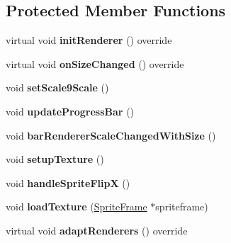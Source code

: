 \subsection*{Protected Member Functions}
\begin{DoxyCompactItemize}
\item 
\mbox{\label{classui_1_1LoadingBar_aac2250cab0b284639e37b63985267aca}} 
virtual void {\bfseries init\+Renderer} () override
\item 
\mbox{\label{classui_1_1LoadingBar_aeb8295a9c1e5ca8bba851e62deba536d}} 
virtual void {\bfseries on\+Size\+Changed} () override
\item 
\mbox{\label{classui_1_1LoadingBar_a5acb157107db30feb6de6da765876b06}} 
void {\bfseries set\+Scale9\+Scale} ()
\item 
\mbox{\label{classui_1_1LoadingBar_a645b86aba1ad5ff8cf62fa35fe93875a}} 
void {\bfseries update\+Progress\+Bar} ()
\item 
\mbox{\label{classui_1_1LoadingBar_acce2f24249cdf7821af3df3947ef3405}} 
void {\bfseries bar\+Renderer\+Scale\+Changed\+With\+Size} ()
\item 
\mbox{\label{classui_1_1LoadingBar_aed719a8122f9eb98daef776075f3b580}} 
void {\bfseries setup\+Texture} ()
\item 
\mbox{\label{classui_1_1LoadingBar_ace25157bdfa2b668a0426dfcf5abdf1c}} 
void {\bfseries handle\+Sprite\+FlipX} ()
\item 
\mbox{\label{classui_1_1LoadingBar_aee2017a5ad5d564eb65c98c746db0583}} 
void {\bfseries load\+Texture} (\hyperlink{classSpriteFrame}{Sprite\+Frame} $\ast$spriteframe)
\item 
\mbox{\label{classui_1_1LoadingBar_aab52bf015f5a9aa4f9ae16e2e10e3498}} 
virtual void {\bfseries adapt\+Renderers} () override
\item 
\mbox{\label{classui_1_1LoadingBar_a68652a2c60ebc7c1bc62756eb848a17c}} 

\end{DoxyCompactItemize}
